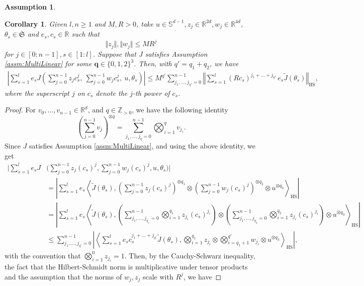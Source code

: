 \documentclass{article}
\newtheorem{corollary}[theorem]{Corollary}
\newtheorem{assumption}{Assumption}
\newcommand{\R}{\mathbb{R}}
\begin{document}
\begin{appendices}
\begin{assumption}
\[\]
\end{assumption}
\begin{corollary}\label{corr:MultiLinearBound} 
Given $l,n\ge 1$ and $M,R>0$, take $u \in \mathbb S^{d-1},z_j\in \R^{2d},w_j\in\R^{4d}$, $\theta_s\in \mathfrak{S}$ and $e_s, c_{s} \in \R$ such that
\[
\Vert z_j\Vert,\Vert w_j\Vert \le MR^j
\]
for $j\in[0:n-1], s\in[1:l]$. Suppose that $J$ satisfies Assumption \ref{assm:MultiLinear} for some $\bm q\in \{0,1,2\}^3$. Then, with $q'=q_1+q_2$, we have
\begin{align*}
    \left|\sum_{s=1}^{l} e_s J\left(\sum_{j=0}^{n-1} z_j c^j_{s} ,\ \sum_{j=0}^{n-1} w_jc^j_{s},\  u,\theta_s\right) \right|\le M^{q'} \sum_{j_{1},\ldots, j_{q'}=0}^{n-1} \left\Vert \sum_{s=1}^l (Rc_s)^{j_1+\ldots +j_{q'}} \,e_s \widetilde J(\theta_s) \right\Vert_\mathrm{HS},
\end{align*}
where the superscript $j$ on $c_s$ denote the $j$-th power of $c_s$.
\end{corollary}
\begin{proof}
For $v_0,\ldots, v_{n-1}\in \R^d$, and $q\in \mathbb Z_{
>0}$, we have the following identity
\[
\left(\sum_{j=0}^{n-1}v_j\right)^{\otimes q} =\sum_{j_1,\ldots, j_q=0}^{n-1} \bigotimes_{i=1}^qv_{j_i}.
\]
Since $J$ satisfies Assumption \ref{assm:MultiLinear}, and using the above identity, we get
\begin{align*}
     \bigg|\sum_{s=1}^{l} e_s J&\bigg(\sum_{j=0}^{n-1} z_j (c_{s})^j,\sum_{j=0}^{n-1} w_j(c_{s})^j, u,\theta_s\bigg) \bigg|\\&= \left|\sum_{s=1}^{l} e_s \left\langle \widetilde J(\theta_s),\left(\sum_{j=0}^{n-1} z_j (c_{s})^j\right)^{\otimes q_1}\otimes\left(\sum_{j=0}^{n-1} w_j(c_{s})^j\right)^{\otimes q_2}\otimes u^{\otimes q_3}\right\rangle_\mathrm{HS} \right|\\&=
     \left|\sum_{s=1}^{l} e_s \left\langle \widetilde J(\theta_s),\left(\sum_{j_1,\ldots ,j_{q_1}=0}^{n-1} \bigotimes_{i=1}^{q_1} z_{j_i} (c_{s})^{j_i}\right)\otimes\left(\sum_{j_1,\ldots, j_{q_2}=0}^{n-1} \bigotimes_{i=1}^{q_2} z_{j_i} (c_{s})^{j_i}\right)\otimes u^{\otimes q_3}\right\rangle_\mathrm{HS} \right|
     \\
     & \le\sum_{j_1,\ldots,j_{q'}=0}^{n-1} \left| \left\langle\sum_{s=1}^{l} e_s c^{j_1+\ldots+j_{q'}}_{s}\widetilde J(\theta_s),\bigotimes_{i=1}^{q_1}z_{j_i}\otimes\bigotimes_{i=q_1+1}^{q'}w_{j_i}\otimes u^{\otimes q_3}\right\rangle_\mathrm{HS} \right|,
\end{align*}
with the convention that $\bigotimes_{i=1}^0z_{j_i}=1$.
Then, by the Cauchy-Schwarz inequality, the fact that the Hilbert-Schmidt norm is multiplicative under tensor products and the assumption that the norms of $w_j,z_j$ scale with $R^j$, we have

\end{proof}
\end{appendices}
\end{document}
